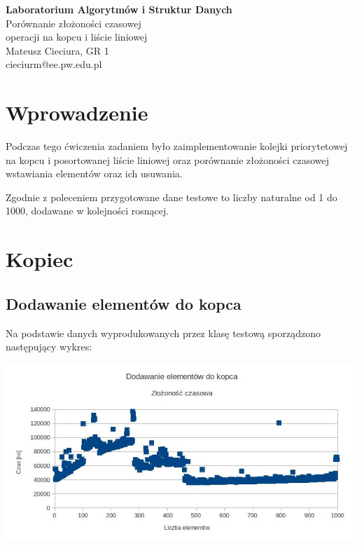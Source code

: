\documentclass[10pt,a4paper]{article}
\begin{document}

\begin{center}
{\Large \textbf{Laboratorium Algorytmów i Struktur Danych} \\ 
Porównanie złożoności czasowej \\ operacji na kopcu i liście liniowej \\}
\vspace{20pt}
Mateusz Cieciura, GR 1 \\ cieciurm@ee.pw.edu.pl
\end{center}

\section{Wprowadzenie}

Podczas tego ćwiczenia zadaniem było zaimplementowanie kolejki priorytetowej na kopcu i posortowanej liście liniowej oraz porównanie złożoności
czasowej wstawiania elementów oraz ich usuwania.

Zgodnie z poleceniem przygotowane dane testowe to liczby naturalne od 1 do 1000, dodawane w kolejności rosnącej.

\section{Kopiec}

\subsection{Dodawanie elementów do kopca}

Na podstawie danych wyprodukowanych przez klasę testową sporządzono następujący wykres:

\includegraphics[scale=0.4]{heap_adding.jpg}
\end{document}
